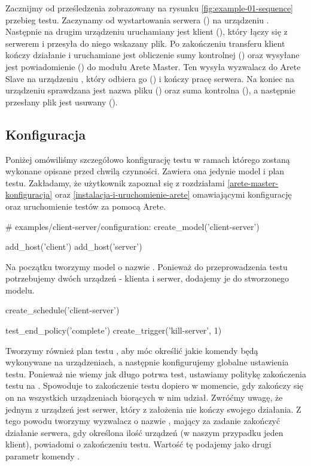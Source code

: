 \documentclass[00-praca-magisterska.tex]{subfiles}
\begin{document}
Zacznijmy od prześledzenia zobrazowany na rysunku \ref{fig:example-01-sequence}
przebieg testu. Zaczynamy od wystartowania serwera () na urządzeniu
.  Następnie na drugim urządzeniu uruchamiany jest klient
(), który łączy się z serwerem i przesyła do niego wskazany plik. Po
zakończeniu transferu klient kończy działanie i uruchamiane jest obliczenie sumy
kontrolnej () oraz wysyłane jest powiadomienie () do modułu
Arete Master. Ten wysyła wyzwalacz do Arete Slave na urządzeniu ,
który odbiera go () i kończy pracę serwera. Na koniec na urządzeniu
 sprawdzana jest nazwa pliku () oraz suma kontrolna
(), a następnie przesłany plik jest usuwany ().

\subsection{Konfiguracja}

Poniżej omówiliśmy szczegółowo konfigurację testu w ramach którego zostaną
wykonane opisane przed chwilą czynności. Zawiera ona jedynie model i plan testu.
Zakładamy, że użytkownik zapoznał się z rozdziałami \ref{arete-master-konfiguracja}
oraz \ref{instalacja-i-uruchomienie-arete} omawiającymi konfigurację oraz uruchomienie
testów za pomocą Arete.

\begin{pythoncode}
  # examples/client-server/configuration:
  create_model('client-server')

  add_host('client')
  add_host('server')
\end{pythoncode}

Na początku tworzymy model o nazwie . Ponieważ do
przeprowadzenia testu potrzebujemy dwóch urządzeń - klienta i serwer, dodajemy
je do stworzonego modelu. 

\begin{pythoncode}
  create_schedule('client-server')

  test_end_policy('complete')
  create_trigger('kill-server', 1)
\end{pythoncode}

Tworzymy również plan testu , aby móc określić jakie komendy
będą wykonywane na urządzeniach, a następnie konfigurujemy globalne ustawienia
testu. Ponieważ nie wiemy jak długo potrwa test, ustawiamy politykę zakończenia
testu na . Spowoduje to zakończenie testu dopiero w momencie, gdy
zakończy się on na wszystkich urządzeniach biorących w nim udział. Zwróćmy
uwagę, że jednym z urządzeń jest serwer, który z założenia nie kończy swojego
działania. Z tego powodu tworzymy wyzwalacz o nazwie , mający
za zadanie zakończyć działanie serwera, gdy określona ilość urządzeń (w naszym
przypadku jeden klient), powiadomi o zakończeniu testu. Wartość tę podajemy jako
drugi parametr komendy .
\end{document}
